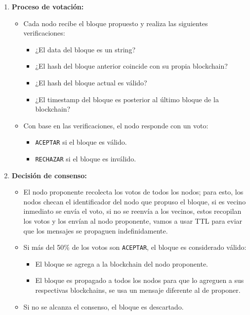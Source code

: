 {{\begin{enumerate}
        \item \textbf{Proceso de votación:}
        \begin{itemize}
            \item Cada nodo recibe el bloque propuesto y realiza las siguientes verificaciones:
            \begin{itemize}
                \item ¿El data del bloque es un string?
                \item ¿El hash del bloque anterior coincide con su propia blockchain?
                \item ¿El hash del bloque actual es válido?
                \item ¿El timestamp del bloque es posterior al último bloque de la blockchain?
            \end{itemize}
            \item Con base en las verificaciones, el nodo responde con un voto:
            \begin{itemize}
                \item \texttt{ACEPTAR} si el bloque es válido.
                \item \texttt{RECHAZAR} si el bloque es inválido.
            \end{itemize}
        \end{itemize}
        
        \item \textbf{Decisión de consenso:}
        \begin{itemize}
            \item El nodo proponente recolecta los votos de todos los nodos; para esto, los nodos checan el identificador del nodo que propuso el bloque, si es vecino inmediato se envía el voto, si no se reenvía a los vecinos, estos recopilan los votos y los envían al nodo proponente, vamos a usar TTL para eviar que los mensajes se propaguen indefinidamente.
            \item Si más del 50\% de los votos son \texttt{ACEPTAR}, el bloque es considerado válido:
            \begin{itemize}
                \item El bloque se agrega a la blockchain del nodo proponente.
                \item El bloque es propagado a todos los nodos para que lo agreguen a sus respectivas blockchains, se usa un mensaje diferente al de proponer.
            \end{itemize}
            \item Si no se alcanza el consenso, el bloque es descartado.
        \end{itemize}
        

\end{enumerate}}}
